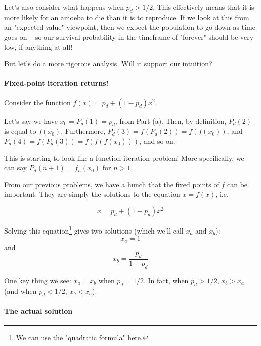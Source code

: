 Let's also consider what happens when $p_d > 1/2$. This effectively means that it is more likely for an amoeba to die than it is to reproduce. If we look at this from an "expected value" viewpoint, then we expect the population to go down as time goes on -- so our survival probability in the timeframe of "forever" should be very low, if anything at all!

But let's do a more rigorous analysis. Will it support our intuition?


\paragraph{Fixed-point iteration returns!}

Consider the function $f(x) = p_d + (1 - p_d)x^2$. 

Let's say we have $x_0 = P_d(1) = p_d$, from Part (a). Then, by definition, $P_d(2)$ is equal to $f(x_0)$. Furthermore, $P_d(3) = f(P_d(2)) = f(f(x_0))$, and $P_d(4) = f(P_d(3)) = f(f(f(x_0)))$, and so on.

This is starting to look like a function iteration problem! More specifically, we can say $P_d(n+1) = f_n(x_0)$ for $n > 1$. 

From our previous problems, we have a hunch that the fixed points of $f$ can be important. They are simply the solutions to the equation $x = f(x)$, i.e.

\begin{equation*}
x = p_d + (1 - p_d)x^2
\end{equation*}

Solving this equation\footnote{We can use the "quadratic formula" here.} gives two solutions (which we'll call $x_a$ and $x_b$):
\begin{equation*}
x_a = 1
\end{equation*}
and 
\begin{equation*}
x_b = \frac{p_d}{1 - p_d}
\end{equation*}

One key thing we see: $x_a = x_b$ when $p_d = 1/2$. In fact, when $p_d > 1/2$, $x_b > x_a$ (and when $p_d < 1/2$, $x_b < x_a$). 




\paragraph{The actual solution}

